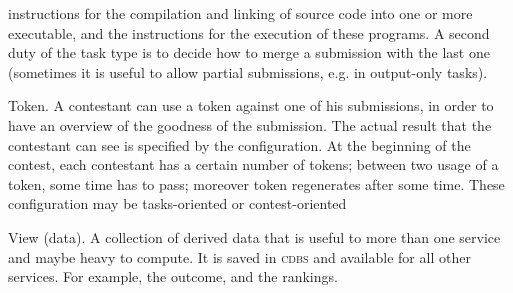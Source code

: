 \documentclass[a4paper,8pt]{amsart}
\newcommand{\CDBS}{\textsc{cdbs}}
\newenvironment{squishlist}{%
  \begin{list}{\textbullet}%
    { \setlength{\itemsep}{0pt}%
      \setlength{\parsep}{3pt}%
      \setlength{\topsep}{3pt}%
      \setlength{\partopsep}{0pt}%
      \setlength{\leftmargin}{1.5em}%
      \setlength{\labelwidth}{1em}%
      \setlength{\labelsep}{0.5em} }%
}{\end{list}}
\begin{document}
\begin{multicols}{2}
\begin{squishlist}
    instructions for the compilation and linking of source code into
    one or more executable, and the instructions for the execution of
    these programs. A second duty of the task type is to decide how to
    merge a submission with the last one (sometimes it is useful to
    allow partial submissions, e.g. in output-only tasks).
  \item[Token.] A contestant can use a token against one of his
    submissions, in order to have an overview of the goodness of the
    submission. The actual result that the contestant can see is
    specified by the configuration. At the beginning of the contest,
    each contestant has a certain number of tokens; between two usage
    of a token, some time has to pass; moreover token regenerates
    after some time. These configuration may be tasks-oriented or
    contest-oriented
  \item[View (data).] A collection of derived data that is useful to
    more than one service and maybe heavy to compute. It is saved in
    \CDBS{} and available for all other services. For example, the
    outcome, and the rankings.
  \end{squishlist}
\end{multicols}
\end{document}
